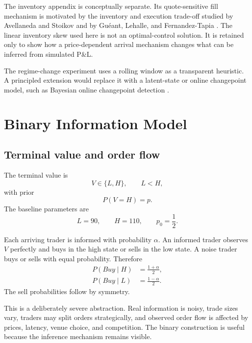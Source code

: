 \documentclass[11pt]{article}
\begin{document}
The inventory appendix is conceptually separate. Its quote-sensitive fill mechanism is motivated by the inventory and execution trade-off studied by Avellaneda and Stoikov \cite{avellaneda_stoikov_2008} and by Gu\'eant, Lehalle, and Fernandez-Tapia \cite{gueant_2013}. The linear inventory skew used here is not an optimal-control solution. It is retained only to show how a price-dependent arrival mechanism changes what can be inferred from simulated P\&L.

The regime-change experiment uses a rolling window as a transparent heuristic. A principled extension would replace it with a latent-state or online changepoint model, such as Bayesian online changepoint detection \cite{adams_mackay_2007}.

\section{Binary Information Model}

\subsection{Terminal value and order flow}

The terminal value is
\begin{equation}
V\in\{L,H\}, \qquad L<H,
\end{equation}
with prior
\begin{equation}
P(V=H)=p.
\end{equation}
The baseline parameters are
\begin{equation}
L=90, \qquad H=110, \qquad p_0=\frac{1}{2}.
\end{equation}

Each arriving trader is informed with probability $\alpha$. An informed trader observes $V$ perfectly and buys in the high state or sells in the low state. A noise trader buys or sells with equal probability. Therefore
\begin{align}
P(Buy\mid H)&=\frac{1+\alpha}{2},\\
P(Buy\mid L)&=\frac{1-\alpha}{2}.
\end{align}
The sell probabilities follow by symmetry.

This is a deliberately severe abstraction. Real information is noisy, trade sizes vary, traders may split orders strategically, and observed order flow is affected by prices, latency, venue choice, and competition. The binary construction is useful because the inference mechanism remains visible.
\end{document}
